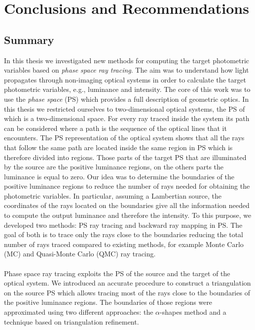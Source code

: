 \chapter{Conclusions and Recommendations}\label{chap:conclusions}
\section{Summary}
In this thesis we investigated new methods for computing the target photometric variables based on \textit{phase space ray tracing}. The aim was to understand how light propagates through non-imaging optical systems in order to calculate the target photometric variables, e.g., luminance and intensity. 
The core of this work was to use the \textit{phase space} (PS) which provides a full description of geometric optics. In this thesis we restricted ourselves to two-dimensional optical systems, the PS of which is a two-dimensional space. For every ray traced inside the system its path can be considered where a path is the sequence of the optical lines that it encounters. The PS representation of the optical system shows that all the rays that follow the same path are located inside the same region in PS which is therefore divided into regions. 
Those parts of the target PS that are illuminated by the source are the positive luminance regions, on the others parts the luminance is equal to zero. Our idea was to determine the boundaries of the positive luminance regions to reduce the number of rays needed for obtaining the photometric variables. In particular, assuming a Lambertian source, the coordinates of the rays located on the boundaries give all the information needed to compute the output luminance and therefore the intensity.
To this purpose, we developed two methods: PS ray tracing and backward ray mapping in PS. The goal of both is to trace only the rays close to the boundaries reducing the total number of rays traced compared to existing methods, for example Monte Carlo (MC) and Quasi-Monte Carlo (QMC) ray tracing.
\\ \\ \indent Phase space ray tracing exploits the PS of the source and the target of the optical system. %
We introduced an accurate procedure to construct a triangulation on the source PS which allows tracing most of the rays close to the boundaries of the positive luminance regions. 
The boundaries of those regions were approximated using two different approaches: the $\alpha$-shapes method and a technique based on triangulation refinement. \\ \indent 
